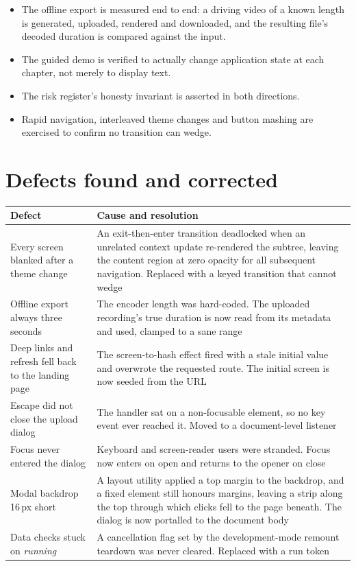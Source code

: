 \documentclass[11pt,a4paper]{report}
\begin{document}
\begin{itemize}
  \item The offline export is measured end to end: a driving video of a known
    length is generated, uploaded, rendered and downloaded, and the resulting
    file's decoded duration is compared against the input.
  \item The guided demo is verified to actually change application state at
    each chapter, not merely to display text.
  \item The risk register's honesty invariant is asserted in both directions.
  \item Rapid navigation, interleaved theme changes and button mashing are
    exercised to confirm no transition can wedge.
\end{itemize}

\section{Defects found and corrected}

\begin{longtable}{L{4.6cm} L{10.2cm}}
\toprule
\textbf{Defect} & \textbf{Cause and resolution} \\
\midrule
\endhead
Every screen blanked after a theme change &
  An exit-then-enter transition deadlocked when an unrelated context update
  re-rendered the subtree, leaving the content region at zero opacity for all
  subsequent navigation. Replaced with a keyed transition that cannot wedge \\
Offline export always three seconds &
  The encoder length was hard-coded. The uploaded recording's true duration is
  now read from its metadata and used, clamped to a sane range \\
Deep links and refresh fell back to the landing page &
  The screen-to-hash effect fired with a stale initial value and overwrote the
  requested route. The initial screen is now seeded from the URL \\
Escape did not close the upload dialog &
  The handler sat on a non-focusable element, so no key event ever reached it.
  Moved to a document-level listener \\
Focus never entered the dialog &
  Keyboard and screen-reader users were stranded. Focus now enters on open and
  returns to the opener on close \\
Modal backdrop 16\,px short &
  A layout utility applied a top margin to the backdrop, and a fixed element
  still honours margins, leaving a strip along the top through which clicks
  fell to the page beneath. The dialog is now portalled to the document body \\
Data checks stuck on \emph{running} &
  A cancellation flag set by the development-mode remount teardown was never
  cleared. Replaced with a run token \\
\bottomrule
\end{longtable}
\end{document}
